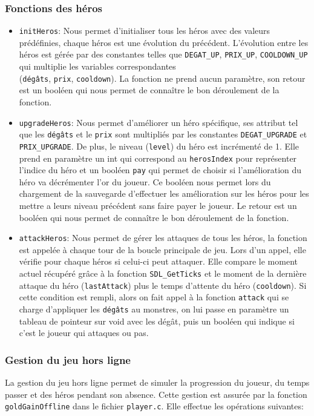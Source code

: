 \documentclass[11pt,a4paper]{article}
\begin{document}
\subsubsection{Fonctions des héros}


\begin{itemize}
    \item \texttt{initHeros}: Nous permet d'initialiser tous les héros avec des valeurs prédéfinies, chaque héros est une évolution du précédent. L'évolution entre les héros est gérée par des constantes telles que \texttt{DEGAT\_UP}, \texttt{PRIX\_UP}, \texttt{COOLDOWN\_UP} qui multiplie les variables correspondantes\\(\texttt{dégâts}, \texttt{prix}, \texttt{cooldown}). La fonction ne prend aucun paramètre, son retour est un booléen qui nous permet de connaître le bon déroulement de la fonction.
    \item \texttt{upgradeHeros}: Nous permet d'améliorer un héro spécifique, ses attribut tel que les \texttt{dégâts} et le \texttt{prix} sont multipliés par les constantes \texttt{DEGAT\_UPGRADE} et \texttt{PRIX\_UPGRADE}. De plus, le niveau (\texttt{level}) du héro est incrémenté de 1.  Elle prend en paramètre un int qui correspond au \texttt{herosIndex} pour représenter l’indice du héro et un booléen \texttt{pay} qui permet de choisir si l'amélioration du héro va décrémenter l’or du joueur. Ce booléen nous permet lors du chargement de la sauvegarde d'effectuer les amélioration sur les héros pour les mettre a leurs niveau précédent sans faire payer le joueur. Le retour est un booléen qui nous permet de connaître le bon déroulement de la fonction. 
\item \texttt{attackHeros}: Nous permet de gérer les attaques de tous les héros, la fonction est appelée à chaque tour de la boucle principale de jeu. Lors d’un appel, elle vérifie pour chaque héros si celui-ci peut attaquer. Elle compare le moment actuel récupéré grâce à la fonction \texttt{SDL\_GetTicks} et le moment de la dernière attaque du héro (\texttt{lastAttack}) plus le temps d'attente du héro (\texttt{cooldown}). Si cette condition est rempli, alors on fait appel à la fonction \texttt{attack} qui se charge d'appliquer les \texttt{dégâts} au monstres, on lui passe en paramètre un tableau de pointeur sur void avec les dégât, puis un booléen qui indique si c’est le joueur qui attaques ou pas.
\end{itemize}

\subsubsection{Gestion du jeu hors ligne}
La gestion du jeu hors ligne permet de simuler la progression du joueur, du temps passer et des héros pendant son absence. Cette gestion est assurée par la fonction \texttt{goldGainOffline} dans le fichier \texttt{player.c}. Elle effectue les opérations suivantes:
\end{document}
